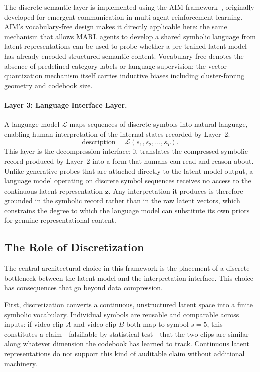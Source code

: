 \documentclass{article}
\begin{document}
The discrete semantic layer is implemented using the AIM
framework~\cite{liu2025aim}, originally developed for emergent
communication in multi-agent reinforcement learning.
AIM's vocabulary-free design makes it directly applicable here: the same mechanism that allows MARL agents to develop a shared symbolic language from latent representations can be used to probe whether a
pre-trained latent model has already encoded structured semantic content. Vocabulary-free denotes the absence of predefined category labels or language supervision; the vector quantization mechanism itself carries inductive biases including cluster-forcing geometry and codebook size.

\paragraph{Layer 3: Language Interface Layer.}
A language model $\mathcal{L}$ maps sequences of discrete symbols
into natural language, enabling human interpretation of the internal
states recorded by Layer~2:
%
\begin{equation}
  \text{description} = \mathcal{L}(s_1, s_2, \ldots, s_T).
  \label{eq:language}
\end{equation}
%
This layer is the decompression interface: it translates the
compressed symbolic record produced by Layer~2 into a form that
humans can read and reason about.
Unlike generative probes that are attached directly to the latent
model output, a language model operating on discrete symbol sequences
receives no access to the continuous latent representation $\mathbf{z}$.
Any interpretation it produces is therefore grounded in the symbolic
record rather than in the raw latent vectors, which constrains the
degree to which the language model can substitute its own priors for
genuine representational content.

\subsection{The Role of Discretization}
\label{sec:role_discretization}

The central architectural choice in this framework is the placement of
a discrete bottleneck between the latent model and the interpretation
interface.
This choice has consequences that go beyond data compression.

First, discretization converts a continuous, unstructured latent space
into a finite symbolic vocabulary.
Individual symbols are reusable and comparable across inputs: if video
clip $A$ and video clip $B$ both map to symbol $s = 5$, this
constitutes a claim---falsifiable by statistical test---that the two
clips are similar along whatever dimension the codebook has learned to
track.
Continuous latent representations do not support this kind of
auditable claim without additional machinery.
\end{document}
